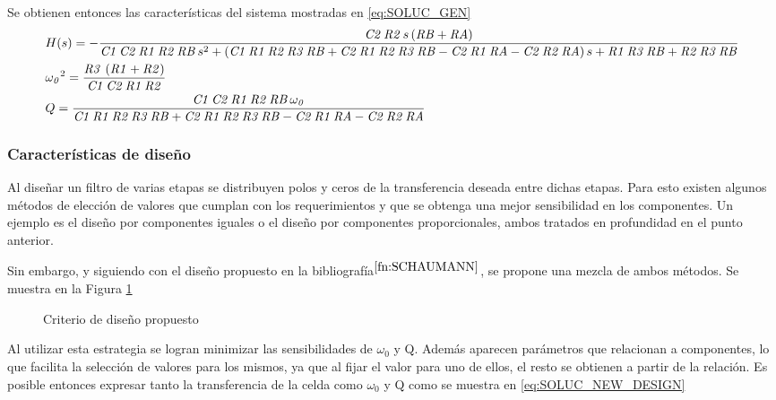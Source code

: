Se obtienen entonces las caracter\'isticas del sistema mostradas en \ref{eq:SOLUC_GEN}
\begin{equation}    
    \centering
        \begin{split}  
            &H(s) = -{\frac {{\it C2}\,{\it R2}\,s \left( {\it RB}+{\it RA} \right) }{{
                \it C1}\,{\it C2}\,{\it R1}\,{\it R2}\,{\it RB}\,{s}^{2}+ \left( {\it 
                C1}\,{\it R1}\,{\it R2}\,{\it R3}\,{\it RB}+{\it C2}\,{\it R1}\,{\it 
                R2}\,{\it R3}\,{\it RB}-{\it C2}\,{\it R1}\,{\it RA}-{\it C2}\,{\it R2
                }\,{\it RA} \right) s+{\it R1}\,{\it R3}\,{\it RB}+{\it R2}\,{\it R3}
                \,{\it RB}}}\\
            &{{\it \omega_0}}^{2}={\frac {{\it R3}\, \left( {\it R1}+{\it R2} \right) }{{
                    \it C1}\,{\it C2}\,{\it R1}\,{\it R2}}}\\
            &Q={\frac {{\it C1}\,{\it C2}\,{\it R1}\,{\it R2}\,{\it RB}\,{\it 
            \omega_0} }{{\it C1}\,{\it R1}\,{
                \it R2}\,{\it R3}\,{\it RB}+{\it C2}\,{\it R1}\,{\it R2}\,{\it R3}\,{
                \it RB}-{\it C2}\,{\it R1}\,{\it RA}-{\it C2}\,{\it R2}\,{\it RA}}} \\
        \end{split}    
    \label{eq:SOLUC_GEN}
\end{equation}


\subsubsection{Caracter\'isticas de dise\~no}
Al dise\~nar un filtro de varias etapas se distribuyen polos y ceros de la transferencia deseada entre dichas etapas. Para esto existen algunos m\'etodos de elecci\'on de valores que cumplan con los requerimientos y que se obtenga una mejor sensibilidad en los componentes. Un ejemplo es el dise\~no por componentes iguales o el dise\~no por componentes proporcionales, ambos tratados en profundidad en el punto anterior. 

Sin embargo, y siguiendo con el dise\~no propuesto en la bibliograf\'ia$^{\ref{fn:SCHAUMANN}}$, se propone una mezcla de ambos m\'etodos. Se muestra en la Figura \ref{fig:RAUCH_VALUES}
\begin{figure}[H]
    \centering
    \caption{Criterio de dise\~no propuesto}
    \label{fig:RAUCH_VALUES}
\end{figure}
Al utilizar esta estrategia se logran minimizar las sensibilidades de $\omega_0$ y Q. Adem\'as aparecen par\'ametros que relacionan a componentes, lo que facilita la selecci\'on de valores para los mismos, ya que al fijar el valor para uno de ellos, el resto se obtienen a partir de la relaci\'on. 
Es posible entonces expresar tanto la transferencia de la celda como $\omega_0 $ y Q como se muestra en \ref{eq:SOLUC_NEW_DESIGN}

